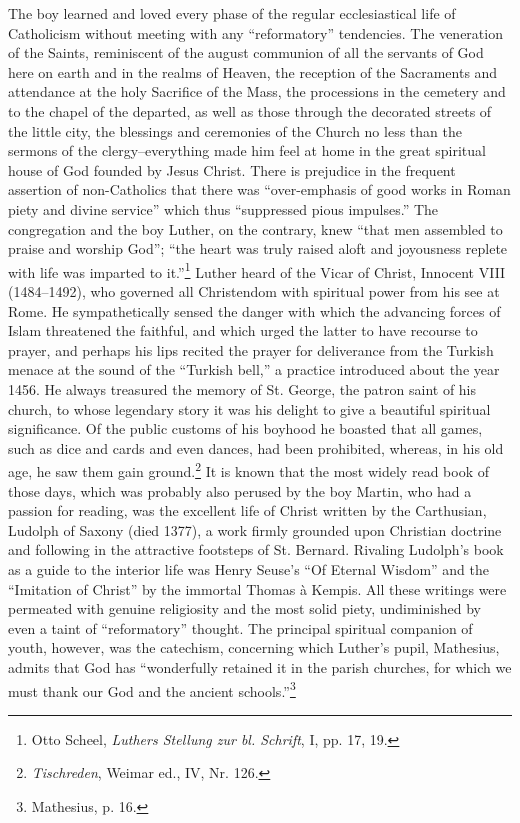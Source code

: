 The boy learned and loved every phase of the regular ecclesiastical
life of Catholicism without meeting with any “reformatory” tendencies.
The veneration of the Saints, reminiscent of the august communion of all the servants
of God here on earth and in the realms of Heaven, the reception of
the Sacraments and attendance at the
holy Sacrifice of the Mass, the processions in the cemetery and to
the chapel of the departed, as well as those through the decorated
streets of the little city, the blessings and ceremonies of the Church
no less than the sermons of the clergy--everything made him feel
at home in the great spiritual house of God founded by Jesus Christ.
There is prejudice in the frequent assertion of non-Catholics that
there was “over-emphasis of good works in Roman piety and divine
service” which thus “suppressed pious impulses.” The congregation
and the boy Luther, on the contrary, knew “that men assembled
to praise and worship God”; “the heart was truly raised aloft and
joyousness replete with life was imparted to it.”\footnote{Otto Scheel, \textit{Luthers Stellung zur bl. Schrift}, I, pp. 17, 19.}
Luther heard of the Vicar of Christ, Innocent VIII (1484--1492), who governed
all Christendom with spiritual power from his see at Rome. He
sympathetically sensed the danger with which the advancing forces
of Islam threatened the faithful, and which urged the latter to have
recourse to prayer, and perhaps his lips recited the prayer for deliverance
from the Turkish menace at the sound of the “Turkish bell,”
a practice introduced about the year 1456. He always treasured
the memory of St. George, the patron saint of his church, to whose
legendary story it was his delight to give a beautiful spiritual
significance. Of the public customs of his boyhood he boasted
that all games, such as dice and cards and even dances, had been
prohibited, whereas, in his old age, he saw them gain ground.\footnote{\textit{Tischreden}, Weimar ed., IV, Nr. 126.}
It
is known that the most widely read book of those days, which was
probably also perused by the boy Martin, who had a passion for
reading, was the excellent life of Christ written by the Carthusian,
Ludolph of Saxony (died 1377), a work firmly grounded upon
Christian doctrine and following in the attractive footsteps of St.
Bernard. Rivaling Ludolph’s book as a guide to the interior life
was Henry Seuse’s “Of Eternal Wisdom” and the “Imitation of
Christ” by the immortal Thomas à Kempis. All these writings were
permeated with genuine religiosity and the most solid piety, undiminished by even a taint of “reformatory” thought. The principal
spiritual companion of youth, however, was the catechism, concerning which Luther’s pupil, Mathesius, admits that God has “wonderfully retained it in the parish churches, for which we must thank
our God and the ancient schools.”\footnote{Mathesius, p. 16.}

